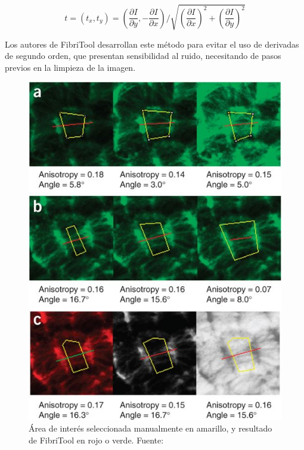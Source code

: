 \begin{equation}
\label{eq:fibritoolTensor}
t = (t_x,t_y) = (
\frac{\partial I}{\partial y}, -\frac{\partial I}{\partial x}) / \sqrt{  
(\frac{\partial I}{\partial x})^2 + 
(\frac{\partial I}{\partial y})^2 }
\end{equation}
 
Los autores de FibriTool desarrollan este m\'etodo para evitar el uso de derivadas de segundo orden, que presentan sensibilidad al ruido, necesitando de pasos previos en la limpieza de la imagen.

\begin{figure}[H]
        \centering
        \includegraphics[scale=0.6]{imagenes/fibritool.jpg}
        \caption{\'Area de inter\'es seleccionada manualmente en amarillo, y resultado de FibriTool en rojo o verde. Fuente: \cite{boudaoud2014fibriltool}}
        \label{fig:fibritool}
\end{figure}


